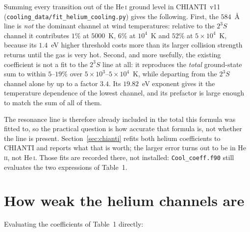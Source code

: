 \documentclass[english,a4paper]{my_memo}
\begin{document}
Summing every transition out of the He\,\textsc{i} ground level in CHIANTI~v11
(\texttt{cooling\_data/fit\_helium\_cooling.py}) gives the following. First,
the $584$~\AA{} line is \emph{not} the dominant channel at wind
temperatures: relative to the $2^3S$ channel it contributes $1\%$ at
$5000$~K, $6\%$ at $10^4$~K and $52\%$ at $5\times10^4$~K, because its
$1.4$~eV higher threshold costs more than its larger collision strength
returns until the gas is very hot. Second, and more usefully, the existing
coefficient is not a fit to the $2^3S$ line at all: it reproduces the
\emph{total} ground-state sum to within $5$--$19\%$ over
$5\times10^3$--$5\times10^4$~K, while departing from the $2^3S$ channel alone
by up to a factor $3.4$. Its $19.82$~eV exponent gives it the temperature
dependence of the lowest channel, and its prefactor is large enough to match
the sum of all of them.

The resonance line is therefore already included in the total this formula
was fitted to, so the practical question is how accurate that formula is, not
whether the line is present. Section~\ref{sec:chianti} refits both helium
coefficients to CHIANTI and reports what that is worth; the larger error turns
out to be in He\,\textsc{ii}, not He\,\textsc{i}. Those fits are recorded there,
not installed: \texttt{Cool\_coeff.f90} still evaluates the two expressions of
Table~1.

\section{How weak the helium channels are}

Evaluating the coefficients of Table~1 directly:
\end{document}
